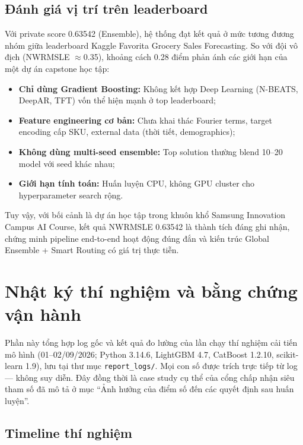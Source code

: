 \documentclass[12pt,a4paper]{report}
\begin{document}
\subsection{Đánh giá vị trí trên leaderboard}

Với private score 0.63542 (Ensemble), hệ thống đạt kết quả ở mức tương đương nhóm giữa leaderboard Kaggle Favorita Grocery Sales Forecasting. So với đội vô địch (NWRMSLE $\approx$0.35), khoảng cách 0.28 điểm phản ánh các giới hạn của một dự án capstone học tập:

\begin{itemize}
    \item \textbf{Chỉ dùng Gradient Boosting:} Không kết hợp Deep Learning (N-BEATS, DeepAR, TFT) vốn thể hiện mạnh ở top leaderboard;
    \item \textbf{Feature engineering cơ bản:} Chưa khai thác Fourier terms, target encoding cấp SKU, external data (thời tiết, demographics);
    \item \textbf{Không dùng multi-seed ensemble:} Top solution thường blend 10--20 model với seed khác nhau;
    \item \textbf{Giới hạn tính toán:} Huấn luyện CPU, không GPU cluster cho hyperparameter search rộng.
\end{itemize}

Tuy vậy, với bối cảnh là dự án học tập trong khuôn khổ Samsung Innovation Campus AI Course, kết quả NWRMSLE 0.63542 là thành tích đáng ghi nhận, chứng minh pipeline end-to-end hoạt động đúng đắn và kiến trúc Global Ensemble + Smart Routing có giá trị thực tiễn.

\section{Nhật ký thí nghiệm và bằng chứng vận hành}

Phần này tổng hợp log gốc và kết quả đo lường của lần chạy thí nghiệm cải tiến mô hình
(01--02/09/2026; Python 3.14.6, LightGBM 4.7, CatBoost 1.2.10, scikit-learn 1.9), lưu
tại thư mục \texttt{report\_logs/}. Mọi con số được trích trực tiếp từ log --- không
suy diễn. Đây đồng thời là case study cụ thể của cổng chấp nhận siêu tham số đã mô tả
ở mục ``Ảnh hưởng của điểm số đến các quyết định sau huấn luyện''.

\subsection{Timeline thí nghiệm}
\end{document}
